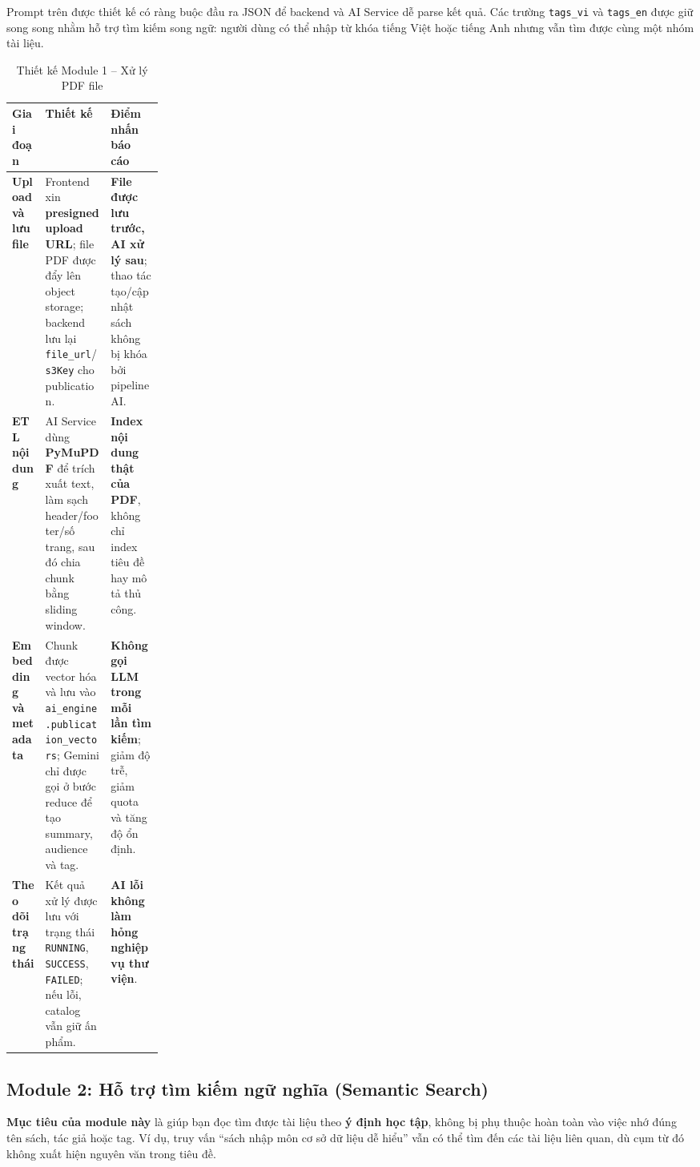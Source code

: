 Prompt trên được thiết kế có ràng buộc đầu ra JSON để backend và AI Service dễ
parse kết quả. Các trường \texttt{tags\_vi} và \texttt{tags\_en} được giữ song
song nhằm hỗ trợ tìm kiếm song ngữ: người dùng có thể nhập từ khóa tiếng Việt
hoặc tiếng Anh nhưng vẫn tìm được cùng một nhóm tài liệu.

\begin{table}[H]
\centering
\small
\renewcommand{\arraystretch}{1.15}
\setlength{\tabcolsep}{4pt}
\begin{tabularx}{\linewidth}{|>{\bfseries}p{0.22\linewidth}|>{\raggedright\arraybackslash}X|>{\raggedright\arraybackslash}X|}
\hline
\textbf{Giai đoạn} & \textbf{Thiết kế} & \textbf{Điểm nhấn báo cáo} \\
\hline
Upload và lưu file & Frontend xin \textbf{presigned upload URL}; file PDF được đẩy lên object storage; backend lưu lại \texttt{file\_url}/\texttt{s3Key} cho publication. & \textbf{File được lưu trước, AI xử lý sau}; thao tác tạo/cập nhật sách không bị khóa bởi pipeline AI. \\
\hline
ETL nội dung & AI Service dùng \textbf{PyMuPDF} để trích xuất text, làm sạch header/footer/số trang, sau đó chia chunk bằng sliding window. & \textbf{Index nội dung thật của PDF}, không chỉ index tiêu đề hay mô tả thủ công. \\
\hline
Embedding và metadata & Chunk được vector hóa và lưu vào \texttt{ai\_engine.publication\_vectors}; Gemini chỉ được gọi ở bước reduce để tạo summary, audience và tag. & \textbf{Không gọi LLM trong mỗi lần tìm kiếm}; giảm độ trễ, giảm quota và tăng độ ổn định. \\
\hline
Theo dõi trạng thái & Kết quả xử lý được lưu với trạng thái \texttt{RUNNING}, \texttt{SUCCESS}, \texttt{FAILED}; nếu lỗi, catalog vẫn giữ ấn phẩm. & \textbf{AI lỗi không làm hỏng nghiệp vụ thư viện}. \\
\hline
\end{tabularx}
\caption{Thiết kế Module 1 -- Xử lý PDF file}
\label{tab:ai_module_pdf}
\end{table}

\subsection{Module 2: Hỗ trợ tìm kiếm ngữ nghĩa (Semantic Search)}

\textbf{Mục tiêu của module này} là giúp bạn đọc tìm được tài liệu theo \textbf{ý định học tập}, không bị phụ thuộc hoàn toàn vào việc nhớ đúng tên sách, tác giả hoặc tag. Ví dụ, truy vấn ``sách nhập môn cơ sở dữ liệu dễ hiểu'' vẫn có thể tìm đến các tài liệu liên quan, dù cụm từ đó không xuất hiện nguyên văn trong tiêu đề.

